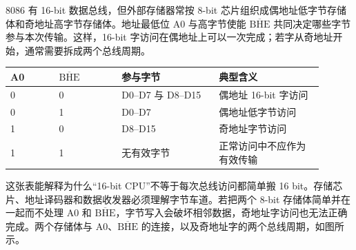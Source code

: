 8086 有 16-bit 数据总线，但外部存储器常按 8-bit 芯片组织成偶地址低字节存储体和奇地址高字节存储体。地址最低位 A0 与高字节使能 $\overline{\mathrm{BHE}}$ 共同决定哪些字节参与本次传输。这样，16-bit 字访问在偶地址上可以一次完成；若字从奇地址开始，通常需要拆成两个总线周期。

\begin{longtable}{L{0.14\linewidth}L{0.18\linewidth}L{0.28\linewidth}L{0.3\linewidth}}
\toprule
A0 & $\overline{\mathrm{BHE}}$ & 参与字节 & 典型含义 \\
 & 0 & D0--D7 与 D8--D15 & 偶地址 16-bit 字访问 \\
0 & 1 & D0--D7 & 偶地址低字节访问 \\
1 & 0 & D8--D15 & 奇地址字节访问 \\
1 & 1 & 无有效字节 & 正常访问中不应作为有效传输 \\
\bottomrule
\end{longtable}

这张表能解释为什么“16-bit CPU”不等于每次总线访问都简单搬 16 bit。存储芯片、地址译码器和数据收发器必须理解字节车道。若把两个 8-bit 存储体简单并在一起而不处理 A0 和 $\overline{\mathrm{BHE}}$，字节写入会破坏相邻数据，奇地址字访问也无法正确完成。两个存储体与 A0、$\overline{\mathrm{BHE}}$ 的连接，以及奇地址字的两个总线周期，如图所示。

